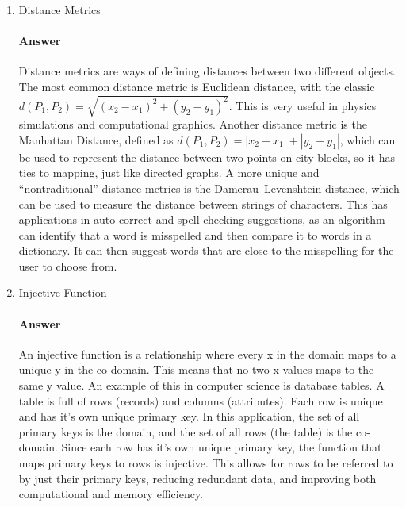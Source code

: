 \documentclass{article}
\begin{document}
\begin{enumerate}
    \item Distance Metrics

        \paragraph{Answer}

        Distance metrics are ways of defining distances between two different objects. The most common distance metric is Euclidean distance, with the classic $d(P_1, P_2) = \sqrt{(x_2-x_1)^2+(y_2-y_1)^2}$. This is very useful in physics simulations and computational graphics. Another distance metric is the Manhattan Distance, defined as $d(P_1, P_2) = |x_2-x_1|+|y_2-y_1|$, which can be used to represent the distance between two points on city blocks, so it has ties to mapping, just like directed graphs. A more unique and ``nontraditional'' distance metrics is the Damerau–Levenshtein distance, which can be used to measure the distance between strings of characters. This has applications in auto-correct and spell checking suggestions, as an algorithm can identify that a word is misspelled and then compare it to words in a dictionary. It can then suggest words that are close to the misspelling for the user to choose from.


    \item Injective Function

        \paragraph{Answer}

        An injective function is a relationship where every x in the domain maps to a unique y in the co-domain. This means that no two x values maps to the same y value. An example of this in computer science is database tables. A table is full of rows (records) and columns (attributes). Each row is unique and has it's own unique primary key. In this application, the set of all primary keys is the domain, and the set of all rows (the table) is the co-domain. Since each row has it's own unique primary key, the function that maps primary keys to rows is injective. This allows for rows to be referred to by just their primary keys, reducing redundant data, and improving both computational and memory efficiency.


\end{enumerate}


 
\end{document}
